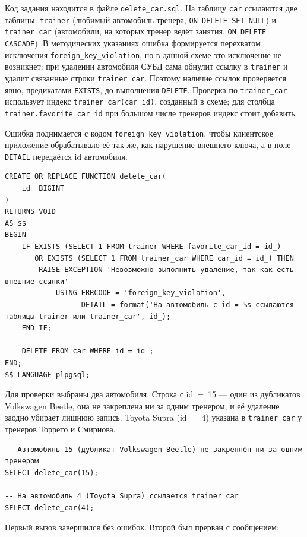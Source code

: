 \documentclass[oneside,a4paper,14pt]{extarticle}
\begin{document}
Код задания находится в файле \texttt{delete\_car.sql}. На таблицу \texttt{car} ссылаются две таблицы: \texttt{trainer} (любимый автомобиль тренера, \texttt{ON DELETE SET NULL}) и \texttt{trainer\_car} (автомобили, на которых тренер ведёт занятия, \texttt{ON DELETE CASCADE}). В методических указаниях ошибка формируется перехватом исключения \texttt{foreign\_key\_violation}, но в данной схеме это исключение не возникнет: при удалении автомобиля СУБД сама обнулит ссылку в \texttt{trainer} и удалит связанные строки \texttt{trainer\_car}. Поэтому наличие ссылок проверяется явно, предикатами \texttt{EXISTS}, до выполнения \texttt{DELETE}. Проверка по \texttt{trainer\_car} использует индекс \texttt{trainer\_car(car\_id)}, созданный в схеме; для столбца \texttt{trainer.favorite\_car\_id} при большом числе тренеров индекс стоит добавить.

Ошибка поднимается с кодом \texttt{foreign\_key\_violation}, чтобы клиентское приложение обрабатывало её так же, как нарушение внешнего ключа, а в поле \texttt{DETAIL} передаётся id автомобиля.

\begin{verbatim}
CREATE OR REPLACE FUNCTION delete_car(
    id_ BIGINT
)
RETURNS VOID
AS $$
BEGIN
    IF EXISTS (SELECT 1 FROM trainer WHERE favorite_car_id = id_)
       OR EXISTS (SELECT 1 FROM trainer_car WHERE car_id = id_) THEN
        RAISE EXCEPTION 'Невозможно выполнить удаление, так как есть внешние ссылки'
            USING ERRCODE = 'foreign_key_violation',
                  DETAIL = format('На автомобиль с id = %s ссылаются таблицы trainer или trainer_car', id_);
    END IF;

    DELETE FROM car WHERE id = id_;
END;
$$ LANGUAGE plpgsql;
\end{verbatim}

Для проверки выбраны два автомобиля. Строка с id~=~15 --- один из дубликатов Volkswagen Beetle, она не закреплена ни за одним тренером, и её удаление заодно убирает лишнюю запись. Toyota Supra (id~=~4) указана в \texttt{trainer\_car} у тренеров Торрето и Смирнова.

\begin{verbatim}
-- Автомобиль 15 (дубликат Volkswagen Beetle) не закреплён ни за одним тренером
SELECT delete_car(15);

-- На автомобиль 4 (Toyota Supra) ссылается trainer_car
SELECT delete_car(4);
\end{verbatim}

Первый вызов завершился без ошибок. Второй был прерван с сообщением:
\end{document}
